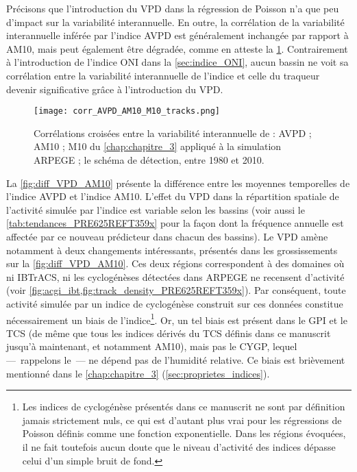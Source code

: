 \documentclass[../main.tex]{subfiles}
\begin{document}
Précisons que l'introduction du VPD dans la régression de Poisson n'a que peu d'impact sur la variabilité interannuelle. En outre, la corrélation de la
variabilité interannuelle inférée par l'indice AVPD est généralement inchangée par rapport à AM10, mais peut également être dégradée, comme en atteste la
\cref{fig:corr_AVPD_AM10_M10}. Contrairement à l'introduction de l'indice ONI dans la \cref{sec:indice_ONI}, aucun bassin ne voit sa corrélation entre la
variabilité interannuelle de l'indice et celle du traqueur devenir significative grâce à l'introduction du VPD.

\begin{figure}[htb]
    \centering
    \texttt{[image: corr\_AVPD\_AM10\_M10\_tracks.png]}
    \caption{Corrélations croisées entre la variabilité interannuelle de : AVPD ; AM10 ; M10 du \cref{chap:chapitre_3} appliqué à la simulation ARPEGE ; le
    schéma de détection, entre 1980 et 2010.}
    \label{fig:corr_AVPD_AM10_M10}
\end{figure}

La \cref{fig:diff_VPD_AM10} présente la différence entre les moyennes temporelles de l'indice AVPD et l'indice AM10. L'effet du VPD dans la répartition spatiale
de l'activité simulée par l'indice est variable selon les bassins (voir aussi le \cref{tab:tendances_PRE625REFT359x} pour la façon dont la fréquence annuelle
est affectée par ce nouveau prédicteur dans chacun des bassins). Le VPD amène notamment à deux changements intéressants, présentés dans les grossissements sur
la \cref{fig:diff_VPD_AM10}. Ces deux régions correspondent à des domaines où ni IBTrACS, ni les cyclogénèses détectées dans ARPEGE ne recensent d'activité
(voir \cref{fig:acgi_ibt,fig:track_density_PRE625REFT359x}). Par conséquent, toute activité simulée par un indice de cyclogénèse construit sur ces données
constitue nécessairement un biais de l'indice\footnote{Les indices de cyclogénèse présentés dans ce manuscrit ne sont par définition jamais strictement nuls, ce
qui est d'autant plus vrai pour les régressions de Poisson définis comme une fonction exponentielle. Dans les régions évoquées, il ne fait toutefois aucun
doute que le niveau d'activité des indices dépasse celui d'un simple bruit de fond.}. Or, un tel biais est présent dans le GPI et le TCS (de même que tous les
indices dérivés du TCS définis dans ce manuscrit jusqu'à maintenant, et notamment AM10), mais pas le CYGP, lequel ---~rappelons le~--- ne dépend pas de
l'humidité relative. Ce biais est brièvement mentionné dans le \cref{chap:chapitre_3} (\cref{sec:proprietes_indices}).
\end{document}
